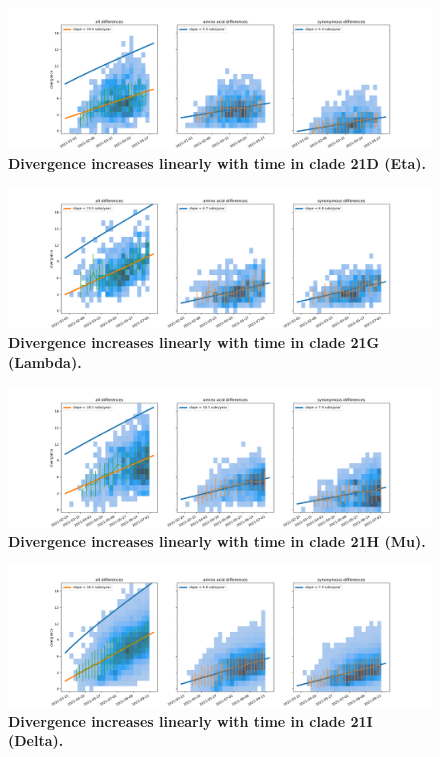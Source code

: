 \begin{figure}
    \includegraphics[width=\textwidth]{figures/rtt/21D_rtt.png}
    \caption{{\bf Divergence increases linearly with time in clade 21D (Eta).}
    \label{fig:21D_divergence}}
\end{figure}

\begin{figure}
    \includegraphics[width=\textwidth]{figures/rtt/21G_rtt.png}
    \caption{{\bf Divergence increases linearly with time in clade 21G (Lambda).}
    \label{fig:21G_divergence}}
\end{figure}

\begin{figure}
    \includegraphics[width=\textwidth]{figures/rtt/21H_rtt.png}
    \caption{{\bf Divergence increases linearly with time in clade 21H (Mu).}
    \label{fig:21H_divergence}}
\end{figure}

\begin{figure}
    \includegraphics[width=\textwidth]{figures/rtt/21I_rtt.png}
    \caption{{\bf Divergence increases linearly with time in clade 21I (Delta).}
    \label{fig:21I_divergence}}
\end{figure}

